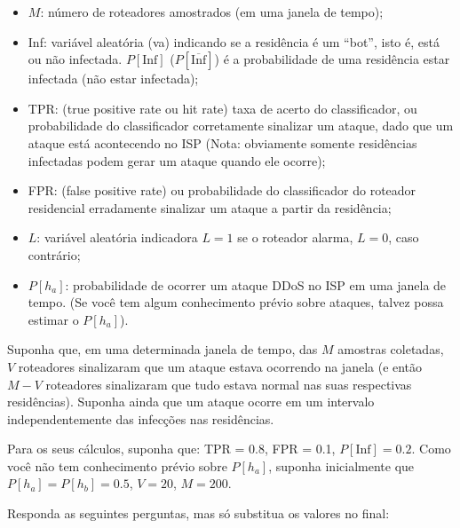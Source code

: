 \documentclass[12 pt]{article}
\begin{document}
\begin{itemize}
    \item $M$: número de roteadores amostrados (em uma janela de tempo);
    \item Inf: variável aleatória (va) indicando se a residência é um “bot”, isto é, está ou não infectada.
    $P[\text{Inf}]$ ($P[\overline{\text{Inf}}]$) é a probabilidade de uma residência estar infectada (não estar infectada);
    \item TPR: (true positive rate ou hit rate) taxa de acerto do classificador, ou probabilidade do classificador corretamente sinalizar um ataque, dado que um ataque está acontecendo no ISP (Nota: obviamente somente residências infectadas podem gerar um ataque quando ele ocorre);
    \item FPR: (false positive rate) ou probabilidade do classificador do roteador residencial erradamente sinalizar um ataque a partir da residência;
    \item $L$: variável aleatória indicadora $L = 1$ se o roteador alarma, $L = 0$, caso contrário;
    \item $P[h_a]$: probabilidade de ocorrer um ataque DDoS no ISP em uma janela de tempo. (Se você tem algum conhecimento prévio sobre ataques, talvez possa estimar o $P[h_a]$).
\end{itemize}

Suponha que, em uma determinada janela de tempo, das $M$ amostras coletadas, $V$ roteadores
sinalizaram que um ataque estava ocorrendo na janela (e então $M - V$ roteadores sinalizaram que
tudo estava normal nas suas respectivas residências). Suponha ainda que um ataque ocorre em um
intervalo independentemente das infecções nas residências.

Para os seus cálculos, suponha que: TPR = 0.8, FPR = 0.1, $P[\text{Inf}] = 0.2$. Como você
não tem conhecimento prévio sobre $P[h_a]$, suponha inicialmente que $P[h_a] = P[h_b] = 0.5$, $V = 20$, $M = 200$.

\vspace{1\baselineskip}
Responda as seguintes perguntas, mas só substitua os valores no final:
\end{document}
